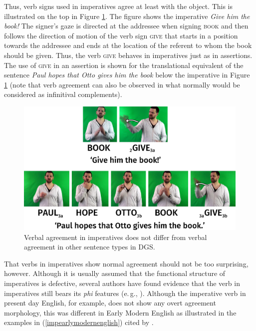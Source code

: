 Thus, verb signs used in imperatives agree at least with the object. This is illustrated on the top in Figure \ref{fig:inflectimp}. The figure shows the imperative \textit{Give him the book!} The signer's gaze is directed at the addressee when signing \textsc{book} and then follows the direction of motion of the verb sign \textsc{give} that starts in a position towards the addressee and ends at the location of the referent to whom the book should be given. Thus, the verb \textsc{give} behaves in imperatives just as in assertions. The use of \textsc{give} in an assertion is shown for the translational equivalent of the sentence \textit{Paul hopes that Otto gives him the book} below the imperative in Figure \ref{fig:inflectimp} (note that verb agreement can also be observed in what normally would be considered as infinitival complements).


\begin{figure}[bt]
\centering
	\includegraphics[width=1.0\textwidth]{inflectimp.jpg}
	\caption{Verbal agreement in imperatives does not differ from verbal agreement in other sentence types in DGS.}
	\label{fig:inflectimp}
\end{figure}

That verbs in imperatives show normal agreement should not be too surprising, however. Although it is usually assumed that the functional structure of imperatives is defective, several authors have found evidence that the verb in imperatives still bears its \textit{phi} features (e.\,g., \citealt{henry1995belfast, rupp2002syntax}). Although the imperative verb in present day English, for example, does not show any overt agreement morphology, this was different in Early Modern English as illustrated in the examples in (\ref{impearlymodernenglish}) cited by \citet[25]{rupp2002syntax}.

